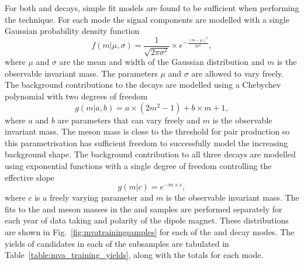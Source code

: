 For both \decay{\Bs}{\jpsi\phiz} and \decay{\Bsb}{\Dsp\pim} decays, simple fit models are found to be sufficient when performing the \sPlot technique. For each mode the signal components are modelled with a single Gaussian probability density function
\begin{equation}
f(m|\mu,\sigma) = \frac{1}{\sqrt{2\pi\sigma^{2}}} \times e^{-\frac{(m-\mu)^{2}}{2\sigma^{2}}}, 
\end{equation}
where $\mu$ and $\sigma$ are the mean and width of the Gaussian distribution and $m$ is the observable invariant mass. The parameters $\mu$ and $\sigma$ are allowed to vary freely.
The background contributions to the \decay{\phiz}{\Kp\Km} decays are modelled using a Chebychev polynomial with two degrees of freedom
\begin{equation}
g(m|a,b) = a\times(2m^{2}-1) + b\times m + 1,
\end{equation}
where $a$ and $b$ are parameters that can vary freely and $m$ is the observable invariant mass. 
The \phiz meson mass is close to the threshold for \Kp\Km pair production so this parametrisation has sufficient freedom to successfully  model the increasing background shape.
The background contribution to all three \Dsp decays are modelled using exponential functions with a single degree of freedom controlling the effective slope
\begin{equation}
g(m|c) = e^{-m\times c},
\end{equation}
where $c$ is a freely varying parameter and $m$ is the observable invariant mass.
The fits to the \phiz and \Dsp meson masses in the \decay{\Bs}{\jpsi\phiz} and \decay{\Bsb}{\Dsp\pim} samples are performed separately for each year of data taking and polarity of the \lhcb dipole magnet. These distributions are shown in Fig.~\ref{fig:mvatrainingsamples} for each of the \phiz and \Dsp decay modes.
The yields of candidates in each of the subsamples are tabulated in Table~\ref{table:mva_training_yields}, along with the totals for each mode. 


